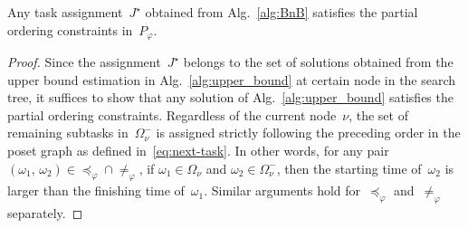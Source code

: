 \begin{lemma}\label{lemma:BnB-satisfying}
Any task assignment~$J^\star$ obtained from Alg.~\ref{alg:BnB} satisfies
the partial ordering constraints in~$P_{\varphi}$.
\end{lemma}
\begin{proof}
Since the assignment~$J^\star$ belongs to the set of solutions obtained from
the upper bound estimation in Alg.~\ref{alg:upper_bound}
at certain node in the search tree, it suffices to show that any solution
of Alg.~\ref{alg:upper_bound} satisfies the partial ordering constraints.
Regardless of the current node~$\nu$, the set of remaining subtasks
in~$\Omega^-_\nu$ is assigned strictly following the preceding order
in the poset graph as defined in~\eqref{eq:next-task}.
In other words, for any pair~$(\omega_1,\,\omega_2)\in \preceq_{\varphi}\cap \neq_{\varphi}$,
if $\omega_1\in \Omega_\nu$ and $\omega_2\in \Omega^-_\nu$,
then the starting time of~$\omega_2$ is larger than the finishing time of~$\omega_1$.
Similar arguments hold for~$\preceq_{\varphi}$ and~$\neq_{\varphi}$ separately.
\end{proof}
